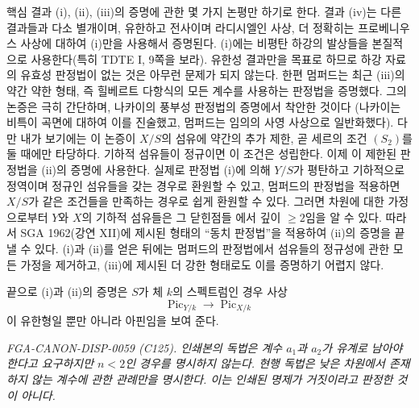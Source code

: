 핵심 결과 (i), (ii), (iii)의 증명에 관한 몇 가지 논평만 하기로 한다.
결과 (iv)는 다른 결과들과 다소 별개이며, 유한하고 전사이며 라디시엘인
사상, 더 정확히는 프로베니우스 사상에 대하여 (i)만을 사용해서 증명된다.
(i)에는 비평탄 하강의 발상들을 본질적으로 사용한다(특히 TDTE I, 9쪽을
보라). 유한성 결과만을 목표로 하므로 하강 자료의 유효성 판정법이 없는
것은 아무런 문제가 되지 않는다. 한편 멈퍼드는 최근 (iii)의 약간 약한
형태, 즉 힐베르트 다항식의 모든 계수를 사용하는 판정법을 증명했다. 그의
논증은 극히 간단하며, 나카이의 풍부성 판정법의 증명에서 착안한 것이다
(나카이는 비특이 곡면에 대하여 이를 진술했고, 멈퍼드는 임의의 사영
사상으로 일반화했다). 다만 내가 보기에는 이 논증이 $X/S$의 섬유에
약간의 추가 제한, 곧 세르의 조건 $(S_2)$를 둘 때에만 타당하다. 기하적
섬유들이 정규이면 이 조건은 성립한다. 이제 이 제한된 판정법을 (ii)의
증명에 사용한다. 실제로 판정법 (i)에 의해 $Y/S$가 평탄하고 기하적으로
정역이며 정규인 섬유들을 갖는 경우로 환원할 수 있고, 멈퍼드의 판정법을
적용하면 $X/S$가 같은 조건들을 만족하는 경우로 쉽게 환원할 수 있다.
그러면 차원에 대한 가정으로부터 $Y$와 $X$의 기하적 섬유들은 그 닫힌점들
에서 깊이 $\geq2$임을 알 수 있다. 따라서 SGA 1962(강연 XII)에 제시된
형태의 ``동치 판정법''을 적용하여 (ii)의 증명을 끝낼 수 있다. (i)과
(ii)를 얻은 뒤에는 멈퍼드의 판정법에서 섬유들의 정규성에 관한 모든
가정을 제거하고, (iii)에 제시된 더 강한 형태로도 이를 증명하기 어렵지
않다.

끝으로 (i)과 (ii)의 증명은 $S$가 체 $k$의 스펙트럼인 경우 사상
\[
\operatorname{Pic}_{Y/k}\longrightarrow\operatorname{Pic}_{X/k}
\]
이 유한형일 뿐만 아니라 아핀임을 보여 준다.

\par\smallskip
\begingroup\footnotesize
\noindent\textit{FGA-CANON-DISP-0059 (C125). 인쇄본의 독법은 계수
$a_1$과 $a_2$가 유계로 남아야 한다고 요구하지만 $n<2$인 경우를
명시하지 않는다. 현행 독법은 낮은 차원에서 존재하지 않는 계수에 관한
관례만을 명시한다. 이는 인쇄된 명제가 거짓이라고 판정한 것이 아니다.}\par
\endgroup
